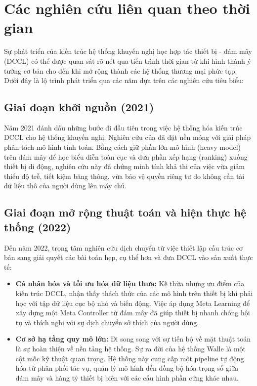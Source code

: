 \section{Các nghiên cứu liên quan theo thời gian}

Sự phát triển của kiến trúc hệ thống khuyến nghị học hợp tác thiết bị - đám mây (DCCL) có thể được quan sát rõ nét qua tiến trình thời gian từ khi hình thành ý tưởng cơ bản cho đến khi mở rộng thành các hệ thống thương mại phức tạp. Dưới đây là lộ trình phát triển qua các năm dựa trên các nghiên cứu tiêu biểu:

\subsection{Giai đoạn khởi nguồn (2021)}
Năm 2021 đánh dấu những bước đi đầu tiên trong việc hệ thống hóa kiến trúc DCCL cho hệ thống khuyến nghị. Nghiên cứu của \cite{yao2021device} đã đặt nền móng với giải pháp phân tách mô hình tính toán. Bằng cách giữ phần lớn mô hình (heavy model) trên đám mây để học biểu diễn toàn cục và đưa phần xếp hạng (ranking) xuống thiết bị di động, nghiên cứu này đã chứng minh tính khả thi của việc vừa giảm thiểu độ trễ, tiết kiệm băng thông, vừa bảo vệ quyền riêng tư do không cần tải dữ liệu thô của người dùng lên máy chủ.

\subsection{Giai đoạn mở rộng thuật toán và hiện thực hệ thống (2022)}
Đến năm 2022, trọng tâm nghiên cứu dịch chuyển từ việc thiết lập cấu trúc cơ bản sang giải quyết các bài toán hẹp, cụ thể hơn và đưa DCCL vào sản xuất thực tế:
\begin{itemize}
    \item \textbf{Cá nhân hóa và tối ưu hóa dữ liệu thưa:} Kế thừa những ưu điểm của kiến trúc DCCL, \cite{yao2022meta} nhận thấy thách thức của các mô hình trên thiết bị khi phải học với tập dữ liệu cục bộ nhỏ và biến động. Việc áp dụng Meta Learning để xây dựng một Meta Controller từ đám mây đã giúp thiết bị nhanh chóng hội tụ và thích nghi với sự dịch chuyển sở thích của người dùng.
    \item \textbf{Cơ sở hạ tầng quy mô lớn:} Đi song song với sự tiến bộ về mặt thuật toán là sự hoàn thiện về nền tảng hệ thống. Sự ra đời của hệ thống Walle \cite{cheng2022walle} là một cột mốc kỹ thuật quan trọng. Hệ thống này cung cấp một pipeline tự động hóa từ phân phối tác vụ, quản lý mô hình đến đồng bộ hóa trọng số giữa đám mây và hàng tỷ thiết bị biên với các cấu hình phần cứng khác nhau.
\end{itemize}

